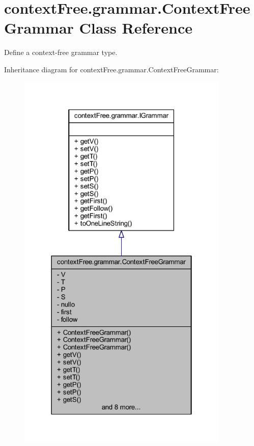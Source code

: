 \hypertarget{classcontext_free_1_1grammar_1_1_context_free_grammar}{\section{context\-Free.\-grammar.\-Context\-Free\-Grammar Class Reference}
\label{classcontext_free_1_1grammar_1_1_context_free_grammar}
}


Define a context-\/free grammar type.  




Inheritance diagram for context\-Free.\-grammar.\-Context\-Free\-Grammar\-:\nopagebreak
\begin{figure}[H]
\begin{center}
\leavevmode
\includegraphics[width=286pt]{classcontext_free_1_1grammar_1_1_context_free_grammar__inherit__graph}
\end{center}
\end{figure}


